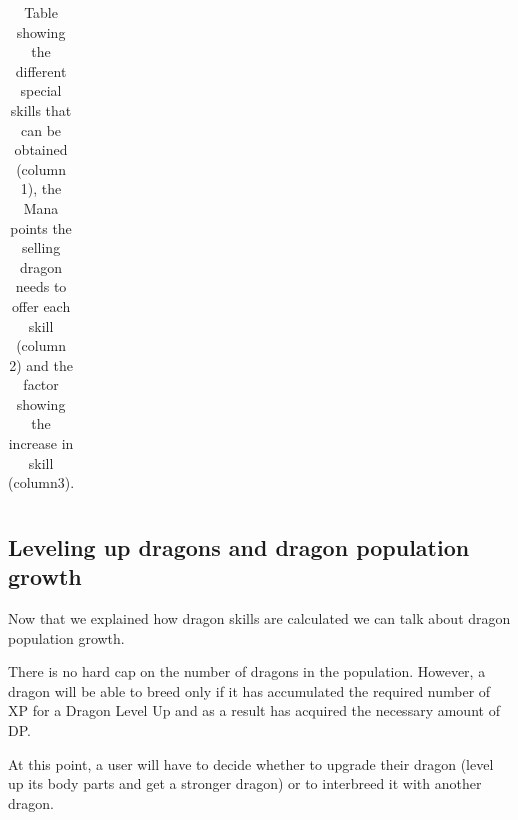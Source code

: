 \documentclass[12pt]{article}
\begin{document}
{\begin{table}[H]
\begin{tabular}{p{1.49in}p{1.92in}p{2.62in}}
\end{tabular}\caption{Table showing the different special skills that can be obtained (column 1), the Mana points the selling dragon needs to offer each skill (column 2) and the factor showing the increase in skill (column3).}
\label{tab:Table showing the different special skills that can be obtained (column 1), the Mana points the selling dragon needs to offer each skill (column 2) and the factor showing the increase in skill (column3).}

 \end{table}




\setlength{\parskip}{9.96pt}
\subsection{Leveling up dragons and dragon population growth}
 \label{Leveling up dragons and dragon population growth}   \par

Now that we explained how dragon skills are calculated we can talk about dragon population growth.\par

There is no hard cap on the number of dragons in the population. However, a dragon will be able to breed only if it has accumulated the required number of XP for a Dragon Level Up and as a result has acquired the necessary amount of DP.\par

At this point, a user will have to decide whether to upgrade their dragon (level up its body parts and get a stronger dragon) or to interbreed it with another dragon.\par

}
\end{document}
